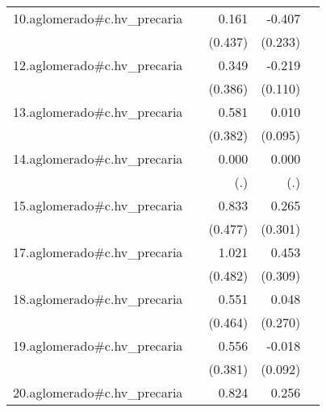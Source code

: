 {\begin{longtable}{l*{4}{D{.}{.}{-1}}}
\addlinespace
10.aglomerado#c.hv\_precaria&                     &       0.161         &      -0.407         &                     \\
            &                     &     (0.437)         &     (0.233)         &                     \\
\addlinespace
12.aglomerado#c.hv\_precaria&                     &       0.349         &      -0.219\sym{*}  &                     \\
            &                     &     (0.386)         &     (0.110)         &                     \\
\addlinespace
13.aglomerado#c.hv\_precaria&                     &       0.581         &       0.010         &                     \\
            &                     &     (0.382)         &     (0.095)         &                     \\
\addlinespace
14.aglomerado#c.hv\_precaria&                     &       0.000         &       0.000         &                     \\
            &                     &         (.)         &         (.)         &                     \\
\addlinespace
15.aglomerado#c.hv\_precaria&                     &       0.833         &       0.265         &                     \\
            &                     &     (0.477)         &     (0.301)         &                     \\
\addlinespace
17.aglomerado#c.hv\_precaria&                     &       1.021\sym{*}  &       0.453         &                     \\
            &                     &     (0.482)         &     (0.309)         &                     \\
\addlinespace
18.aglomerado#c.hv\_precaria&                     &       0.551         &       0.048         &                     \\
            &                     &     (0.464)         &     (0.270)         &                     \\
\addlinespace
19.aglomerado#c.hv\_precaria&                     &       0.556         &      -0.018         &                     \\
            &                     &     (0.381)         &     (0.092)         &                     \\
\addlinespace
20.aglomerado#c.hv\_precaria&                     &       0.824         &       0.256         &                     \\

\end{longtable}}
